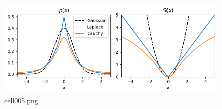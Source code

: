 \begin{figure}[ht]
	\centering
	\includegraphics[scale=0.8, max width=\linewidth]{./fig/energy-based-model/sparse-coding/cell005.png}
	\caption{cell005.png}
	\label{cell005.png}
\end{figure}